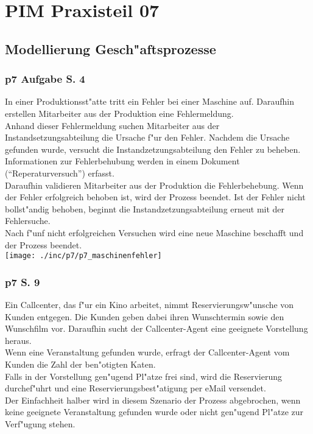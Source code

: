 
\chapter{PIM Praxisteil 07}

\section{Modellierung Gesch"aftsprozesse}

\subsection{p7 Aufgabe S. 4}

In einer Produktionsst"atte tritt ein Fehler bei einer Maschine auf.
Daraufhin erstellen Mitarbeiter aus der Produktion eine Fehlermeldung.\\
Anhand dieser Fehlermeldung suchen Mitarbeiter aus der Instandsetzungsabteilung die Ursache f"ur den Fehler.
Nachdem die Ursache gefunden wurde, versucht die Instandzetzungsabteilung den Fehler zu beheben.
Informationen zur Fehlerbehubung werden in einem Dokument ("`Reperaturversuch"') erfasst.\\
Daraufhin validieren Mitarbeiter aus der Produktion die Fehlerbehebung.
Wenn der Fehler erfolgreich behoben ist, wird der Prozess beendet.
Ist der Fehler nicht bollst"andig behoben, beginnt die Instandzetzungsabteilung erneut mit der Fehlersuche.\\
Nach f"unf nicht erfolgreichen Versuchen wird eine neue Maschine beschafft und der Prozess beendet.\\

\texttt{[image: ./inc/p7/p7\_maschinenfehler]}


\subsection{p7 S. 9}

Ein Callcenter, das f"ur ein Kino arbeitet, nimmt Reservierungsw"unsche von Kunden entgegen.
Die Kunden geben dabei ihren Wunschtermin sowie den Wunschfilm vor.
Daraufhin sucht der Callcenter-Agent eine geeignete Vorstellung heraus.\\
Wenn eine Veranstaltung gefunden wurde, erfragt der Callcenter-Agent vom Kunden die Zahl der ben"otigten Katen.\\
Falls in der Vorstellung gen"ugend Pl"atze frei sind, wird die Reservierung durchef"uhrt und eine Reservierungsbest"atigung per eMail versendet.\\
Der Einfachheit halber wird in diesem Szenario der Prozess abgebrochen, wenn keine geeignete Veranstaltung gefunden wurde oder nicht gen"ugend Pl"atze zur Verf"ugung stehen.\\


